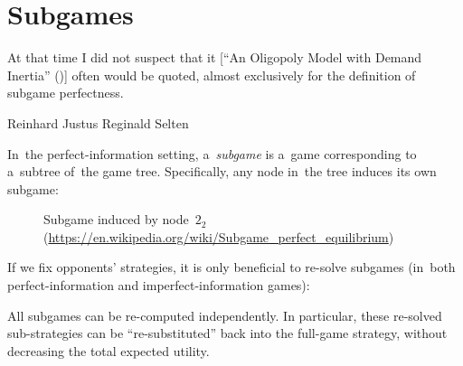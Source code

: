 \section{Subgames}
\epigraph{
  At that time I did not suspect that it [``An Oligopoly Model with Demand Inertia'' (\cite{Selten1968oligopoly})] often would be quoted, almost exclusively for the definition of subgame perfectness.
}{Reinhard Justus Reginald Selten}
In~the perfect-information setting, a~\emph{subgame} is a~game corresponding to a~subtree of~the game tree.
Specifically, any node in~the tree induces its own subgame:
\begin{figure}[H]
  \centering
  \scriptsize
  \def\svgwidth{.7\textwidth}
  
  \def\captionTitle{Subgame induced by node~$2_2$}
  \caption[\captionTitle]{\captionTitle{}\\ (\href{https://en.wikipedia.org/wiki/Subgame_perfect_equilibrium}{https://en.wikipedia.org/wiki/Subgame\_perfect\_equilibrium})}
  \label{fig:ext-form-subgame}
\end{figure}

If we fix opponents' strategies, it is only beneficial to re-solve subgames (in~both perfect-information and imperfect-information games):
\begin{thm}
  \label{thm:perf-info-subgames}
  All subgames can be re-computed independently.
  In particular, these re-solved sub-strategies can be ``re-substituted'' back into the full-game strategy, without decreasing the total expected utility.
\end{thm}

